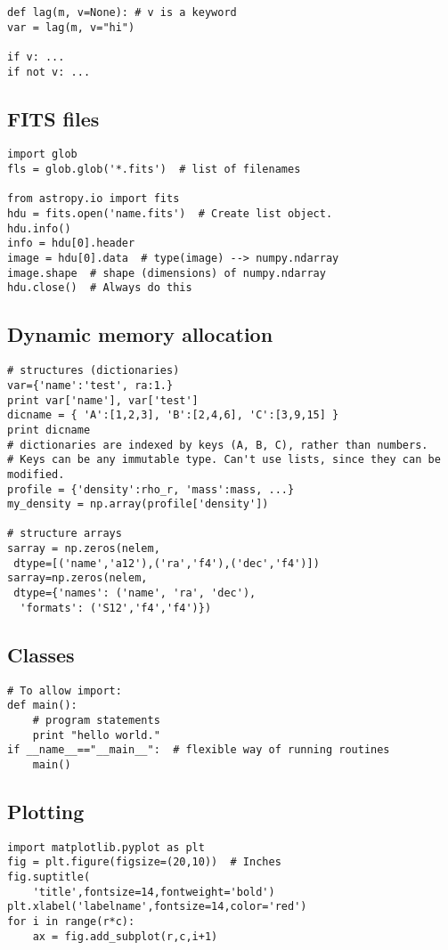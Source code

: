 \documentclass{article}
\begin{document}
\begin{multicols}{2}
\begin{lstlisting}
def lag(m, v=None): # v is a keyword
var = lag(m, v="hi")

if v: ...
if not v: ...
\end{lstlisting}
\columnbreak


\subsection{FITS files}
\begin{lstlisting}
import glob
fls = glob.glob('*.fits')  # list of filenames

from astropy.io import fits
hdu = fits.open('name.fits')  # Create list object.
hdu.info()
info = hdu[0].header
image = hdu[0].data  # type(image) --> numpy.ndarray
image.shape  # shape (dimensions) of numpy.ndarray
hdu.close()  # Always do this
\end{lstlisting}

\subsection{Dynamic memory allocation}
\begin{lstlisting}
# structures (dictionaries)
var={'name':'test', ra:1.}
print var['name'], var['test']
dicname = { 'A':[1,2,3], 'B':[2,4,6], 'C':[3,9,15] }
print dicname
# dictionaries are indexed by keys (A, B, C), rather than numbers.
# Keys can be any immutable type. Can't use lists, since they can be modified.
profile = {'density':rho_r, 'mass':mass, ...}
my_density = np.array(profile['density'])

# structure arrays
sarray = np.zeros(nelem,
 dtype=[('name','a12'),('ra','f4'),('dec','f4')])
sarray=np.zeros(nelem,
 dtype={'names': ('name', 'ra', 'dec'),
  'formats': ('S12','f4','f4')})
\end{lstlisting}

\subsection{Classes}
\begin{lstlisting}
# To allow import:
def main():
    # program statements
    print "hello world."
if __name__=="__main__":  # flexible way of running routines
    main()
\end{lstlisting}

\newpage
\subsection{Plotting}
\begin{lstlisting}
import matplotlib.pyplot as plt
fig = plt.figure(figsize=(20,10))  # Inches
fig.suptitle(
    'title',fontsize=14,fontweight='bold')
plt.xlabel('labelname',fontsize=14,color='red')
for i in range(r*c):
    ax = fig.add_subplot(r,c,i+1)


\end{lstlisting}
\end{multicols}
\end{document}
